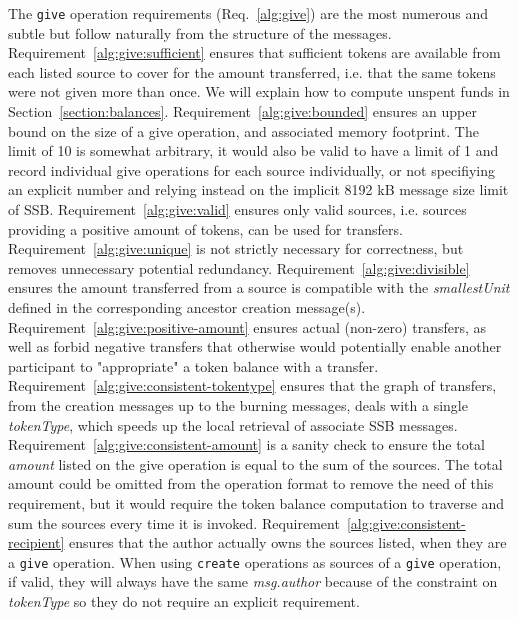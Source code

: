\documentclass[sigplan,screen,10pt]{acmart}
\begin{document}
The \texttt{give} operation requirements (Req.~\ref{alg:give}) are the most numerous and subtle but follow naturally from the structure of the messages. Requirement~\ref{alg:give:sufficient} ensures that sufficient tokens are available from each listed source to cover for the amount transferred, i.e. that the same tokens were not given more than once. We will explain how to compute unspent funds in Section~\ref{section:balances}. Requirement~\ref{alg:give:bounded} ensures an upper bound on the size of a give operation, and associated memory footprint. The limit of 10 is somewhat arbitrary, it would also be valid to have a limit of 1 and record individual give operations for each source individually, or not specifiying an explicit number and relying instead on the implicit 8192 kB message size limit of SSB. Requirement~\ref{alg:give:valid} ensures only valid sources, i.e. sources providing a positive amount of tokens, can be used for transfers. Requirement~\ref{alg:give:unique} is not strictly necessary for correctness, but removes unnecessary potential redundancy. Requirement~\ref{alg:give:divisible} ensures the amount transferred from a source is compatible with the \textit{smallestUnit} defined in the corresponding ancestor creation message(s). Requirement~\ref{alg:give:positive-amount} ensures actual (non-zero) transfers, as well as forbid negative transfers that otherwise would potentially enable another participant to "appropriate" a token balance with a transfer. Requirement~\ref{alg:give:consistent-tokentype} ensures that the graph of transfers, from the creation messages up to the burning messages, deals with a single \textit{tokenType}, which speeds up the local retrieval of associate SSB messages. Requirement~\ref{alg:give:consistent-amount} is a sanity check to ensure the total \textit{amount} listed on the give operation is equal to the sum of the sources. The total amount could be omitted from the operation format to remove the need of this requirement, but it would require the token balance computation to traverse and sum the sources every time it is invoked. Requirement~\ref{alg:give:consistent-recipient} ensures that the author actually owns the sources listed, when they are a \texttt{give} operation. When using \texttt{create} operations as sources of a \texttt{give} operation, if valid, they will always have the same \textit{msg.author} because of the constraint on \textit{tokenType} so they do not require an explicit requirement.
\end{document}
